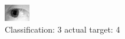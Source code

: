 \begin{figure}[h!]
\begin{center}
\includegraphics[width=0.60\columnwidth]{figures/ID1218_class_3_target_4.png}
\end{center}
\caption{ Classification: 3 actual target: 4}
\label{fig:ID1218_class_3_target_4}
\end{figure}
